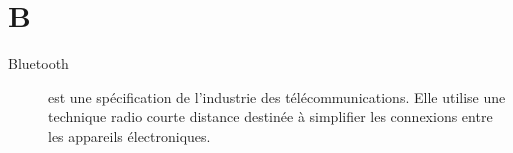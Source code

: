 \section{B}

\begin{description}
\item[Bluetooth]
est une spécification de l'industrie des télécommunications. Elle utilise une technique radio courte distance destinée à simplifier les connexions entre les appareils électroniques.
\end{description}
